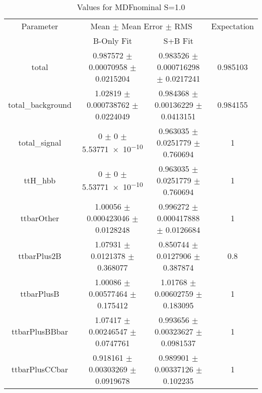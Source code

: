 \begin{table}
\centering
\caption{Values for MDFnominal S=1.0}
\begin{tabular}{cccc}
\toprule
Parameter & \multicolumn{2}{c}{Mean $\pm$ Mean Error $\pm$ RMS} & Expectation\\
 & B-Only Fit & S+B Fit & \\
\midrule
total & \num{0.987572} $\pm$ \num{0.00070958} $\pm$ \num{0.0215204} & \num{0.983526} $\pm$ \num{0.000716298} $\pm$ \num{0.0217241} & \num{0.985103}\\
total\_background & \num{1.02819} $\pm$ \num{0.000738762} $\pm$ \num{0.0224049} & \num{0.984368} $\pm$ \num{0.00136229} $\pm$ \num{0.0413151} & \num{0.984155}\\
total\_signal & \num{0} $\pm$ \num{0} $\pm$ \num{5.53771e-10} & \num{0.963035} $\pm$ \num{0.0251779} $\pm$ \num{0.760694} & \num{1}\\
ttH\_hbb & \num{0} $\pm$ \num{0} $\pm$ \num{5.53771e-10} & \num{0.963035} $\pm$ \num{0.0251779} $\pm$ \num{0.760694} & \num{1}\\
ttbarOther & \num{1.00056} $\pm$ \num{0.000423046} $\pm$ \num{0.0128248} & \num{0.996272} $\pm$ \num{0.000417888} $\pm$ \num{0.0126684} & \num{1}\\
ttbarPlus2B & \num{1.07931} $\pm$ \num{0.0121378} $\pm$ \num{0.368077} & \num{0.850744} $\pm$ \num{0.0127906} $\pm$ \num{0.387874} & \num{0.8}\\
ttbarPlusB & \num{1.00086} $\pm$ \num{0.00577464} $\pm$ \num{0.175412} & \num{1.01768} $\pm$ \num{0.00602759} $\pm$ \num{0.183095} & \num{1}\\
ttbarPlusBBbar & \num{1.07417} $\pm$ \num{0.00246547} $\pm$ \num{0.0747761} & \num{0.993656} $\pm$ \num{0.00323627} $\pm$ \num{0.0981537} & \num{1}\\
ttbarPlusCCbar & \num{0.918161} $\pm$ \num{0.00303269} $\pm$ \num{0.0919678} & \num{0.989901} $\pm$ \num{0.00337126} $\pm$ \num{0.102235} & \num{1}\\
\bottomrule
\end{tabular}
\end{table}